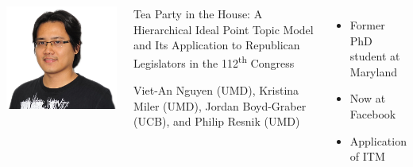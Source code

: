 \documentclass[compress]{beamer}
\begin{document}




\begin{frame}{}

  \begin{columns}
      \includegraphics[width=.9\linewidth]{general_figures/an}
    \begin{block}{Tea Party in the House: A Hierarchical Ideal Point Topic Model
  and Its Application to Republican Legislators in the 112\textsuperscript{th} Congress}
  
  Viet-An Nguyen (UMD), Kristina Miler (UMD), Jordan Boyd-Graber (UCB), and Philip Resnik (UMD)
  
    \end{block}
      \begin{itemize}
        \item Former PhD student at Maryland
        \item Now at Facebook
        \item Application of ITM
      \end{itemize}
  \end{columns}

\end{frame}
\end{document}

